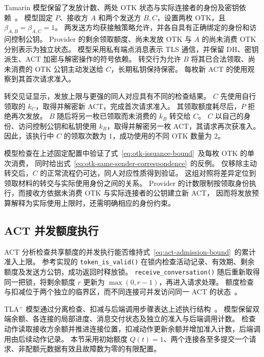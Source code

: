 Tamarin 模型保留了发放计数、两处 OTK 状态与实际连接者的身份及密钥依赖~\cite{meier2013tamarin}。
模型固定 $P$、接收方 $A$ 和两个发送方 $B,C$，设置两枚 OTK，且 $\beta_{A,B}=\beta_{A,C}=1$。
两发送方均获接触策略允许，并各自具有正确绑定的身份和访问控制公钥。
Provider 的剩余领取额度、尚未发放 OTK 与 $A$ 的尚未消费 OTK 分别表示为独立状态。
模型采用私有端点消息表示 TLS 通信，并保留 DH、密钥派生、ACT 加密与解密操作的符号依赖。
转交行为允许 $B$ 将其已合法领取、尚未消费的 OTK 公钥主动发送给 $C$，长期私钥保持保密。
每枚新 ACT 的使用观察到其首次请求准入。

转交见证显示，发放上限与更强的同人对应具有不同的检查结果。
$C$ 先使用自行领取的 $k_C$，取得并解密新 ACT，完成首次请求准入。
其领取额度耗尽后，$P$ 拒绝再次发放。
$B$ 随后将另一枚已领取而未消费的 $k_B$ 转交给 $C$。
$C$ 以自己的身份、访问控制公钥和私钥使用 $k_B$，取得并解密另一枚 ACT，其请求再次获准入。
因此，该执行中 $C$ 的领取次数为 $1$，成功使用的不同 OTK 数量为 $2$。

模型检查在上述固定配置中验证了式~\eqref{eq:otk-issuance-bound}~及每枚 OTK 的单次消费，
同时给出式~\eqref{eq:otk-same-sender-correspondence}~的反例。
仅移除主动转交后，$C$ 的正常流程仍可达，同人对应性质得到验证。
这组对照将差异定位到领取材料的转交与实际使用身份之间的关系。
Provider 的计数限制按领取身份执行，而接收方依据未消费 OTK 与实际连接者的公钥建立新 ACT，
因而将发放预算解释为实际使用上限时，还需明确相应的身份约束。

\subsection{ACT 并发额度执行}
\label{subsec:act-concurrent-quota}

ACT 分析检查共享额度的并发执行能否维持式~\eqref{eq:act-admission-bound}~的累计准入上限。
参考实现的 \texttt{token\_is\_valid()} 在锁内检查活动记录、有效期、剩余额度及发送方公钥，成功返回时释放锁。
\texttt{receive\_conversation()} 随后重新取得同一把锁，将剩余额度 $r$ 更新为 $\max(0,r-1)$，再进入请求处理。
额度检查与扣减位于两个独立的临界区，而不同连接可并发访问同一 ACT 的状态~\cite{sagaReferenceImpl2026}。

TLA$^{+}$ 模型通过分离检查、扣减与后端调用步骤表达上述执行结构~\cite{lamport2002specifying}。
模型保留双端余额、各连接的局部进度、消息交付状态及独立的准入与后端调用计数。
检查动作读取接收方余额并推进连接位置，扣减动作更新余额并增加准入计数，后端调用由后续动作记录。
本节采用初始额度 $Q(t)=1$、两个连接各至多提交一个请求、非配额元数据有效且故障数为零的有限配置。

